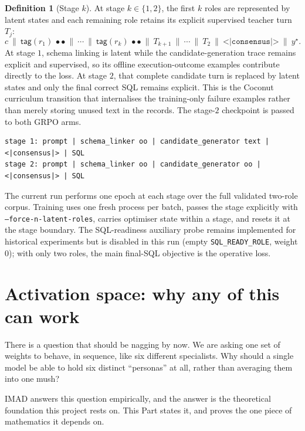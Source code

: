 \documentclass[11pt]{article}
\theoremstyle{definition}
\newtheorem{definition}[theorem]{Definition}
\begin{document}
\begin{definition}[Stage $k$]
\label{def:stage}
At stage $k\in\{1,2\}$, the first $k$ roles are represented by latent states and each remaining role retains its explicit supervised teacher turn $T_j$:
\[
c\ \big\|\ \textsf{tag}(r_1)\,\bullet\bullet\ \big\|\ \cdots\ \big\|\ \textsf{tag}(r_k)\,\bullet\bullet\ \big\|\ T_{k+1}\ \big\|\ \cdots\ \big\|\ T_2\ \big\|\ \texttt{<|consensus|>}\ \big\|\ y^\star .
\tag{5.2}
\]
At stage $1$, schema linking is latent while the candidate-generation trace remains explicit and supervised, so its offline execution-outcome examples contribute directly to the loss. At stage $2$, that complete candidate turn is replaced by latent states and only the final correct SQL remains explicit. This is the Coconut curriculum transition that internalises the training-only failure examples rather than merely storing unused text in the records. The stage-$2$ checkpoint is passed to both GRPO arms.
\end{definition}

\begin{lstlisting}
stage 1: prompt | schema_linker oo | candidate_generator text | <|consensus|> | SQL
stage 2: prompt | schema_linker oo | candidate_generator oo | <|consensus|> | SQL
\end{lstlisting}

The current run performs one epoch at each stage over the full validated two-role corpus. Training uses one fresh process per batch, passes the stage explicitly with \texttt{--force-n-latent-roles}, carries optimiser state within a stage, and resets it at the stage boundary. The SQL-readiness auxiliary probe remains implemented for historical experiments but is disabled in this run (empty \texttt{SQL\_READY\_ROLE}, weight $0$); with only two roles, the main final-SQL objective is the operative loss.

\newpage
\part{Activation space: why any of this can work}
\label{part:activation}

There is a question that should be nagging by now. We are asking one set of weights to behave, in sequence, like six different specialists. Why should a single model be able to hold six distinct ``personas'' at all, rather than averaging them into one mush?

IMAD answers this question empirically, and the answer is the theoretical foundation this project rests on. This Part states it, and proves the one piece of mathematics it depends on.
\end{document}
